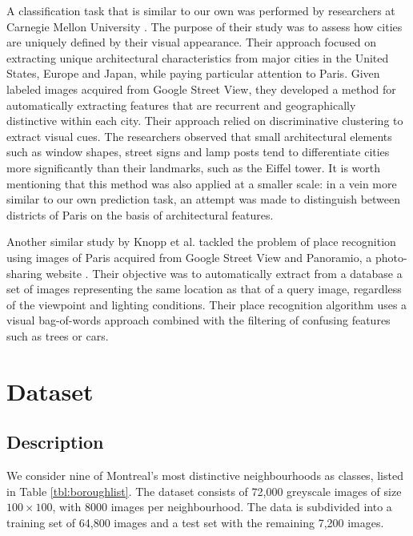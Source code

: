 \documentclass{acm_proc_article-sp}
\begin{document}
A classification task that is similar to our own was performed by researchers at Carnegie Mellon University \cite{Doersch}. The purpose of their study was to assess how cities are uniquely defined by their visual appearance. Their approach focused on extracting unique architectural characteristics from major cities in the United States, Europe and Japan, while paying particular attention to Paris. Given labeled images acquired from Google Street View, they developed a method for automatically extracting features that are recurrent and geographically distinctive within each city. Their approach relied on discriminative clustering to extract visual cues. The researchers observed that small architectural elements such as window shapes, street signs and lamp posts tend to differentiate cities more significantly than their landmarks, such as the Eiffel tower. It is worth mentioning that this method was also applied at a smaller scale: in a vein more similar to our own prediction task, an attempt was made to distinguish between districts of Paris on the basis of architectural features.

Another similar study by Knopp et al. tackled the problem of place recognition using images of Paris acquired from Google Street View and Panoramio, a photo-sharing website \cite{Knopp}. Their objective was to automatically extract from a database a set of images representing the same location as that of a query image, regardless of the viewpoint and lighting conditions. Their place recognition algorithm uses a visual bag-of-words approach combined with the filtering of confusing features such as trees or cars. 

\section{Dataset}

\subsection{Description}
We consider nine of Montreal's most distinctive neighbourhoods as classes, listed in Table \ref{tbl:boroughlist}. The dataset consists of 72,000 greyscale images of size $100\times100$, with 8000 images per neighbourhood. The data is subdivided into a training set of 64,800 images and a test set with the remaining 7,200 images. 
\end{document}
